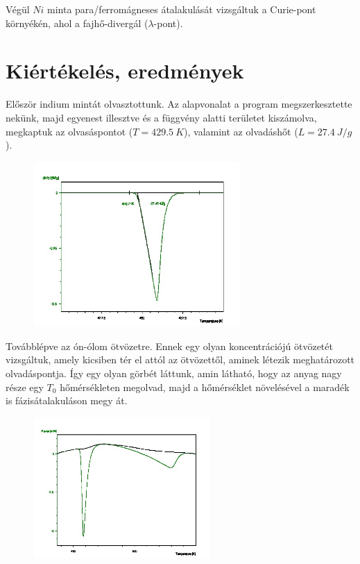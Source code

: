 \documentclass[a4paper,12pt]{article}
\begin{document}
\vspace{5mm}

\par Végül $Ni$ minta para/ferromágneses átalakulását vizsgáltuk a Curie-pont környékén, ahol a fajhő-divergál ($\lambda$-pont).

\newpage

\section{Kiértékelés, eredmények}

\par  Először indium mintát olvasztottunk. Az alapvonalat a program megszerkesztette nekünk, majd egyenest illesztve és a függvény alatti területet kiszámolva, megkaptuk az olvasáspontot ($T = 429.5 ~K$), valamint az olvadáshőt ($L = 27.4 ~J/g$). 

\begin{figure}[H]
\centering
\includegraphics[width=0.7\textwidth]{2outs.jpg}
\end{figure}

\par Továbblépve az ón-ólom ötvözetre. Ennek egy olyan koncentrációjú ötvözetét vizsgáltuk, amely kicsiben tér el attól az ötvözettől, aminek létezik meghatározott olvadáspontja. Így egy olyan görbét láttunk, amin látható, hogy az anyag nagy része egy $T_{0}$ hőmérsékleten megolvad, majd a hőmérséklet növelésével a maradék is fázisátalakuláson megy át. 

\begin{figure}[H]
\centering
\includegraphics[width=0.6\textwidth]{3outs.jpg}
\end{figure}
\end{document}
